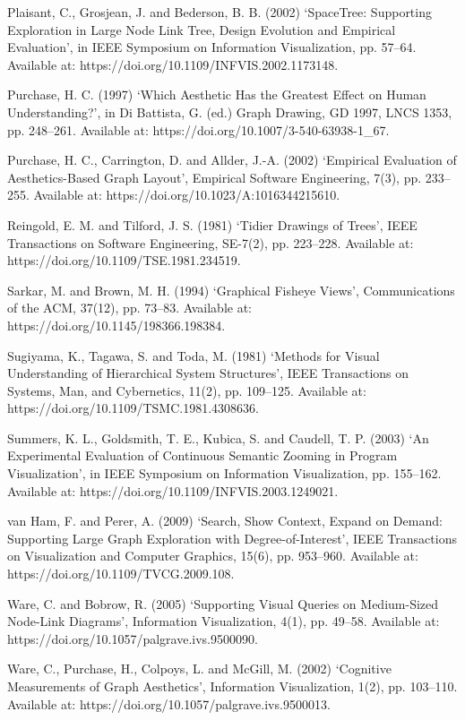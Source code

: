 \documentclass[11pt,a4paper,oneside,extrafontsizes]{memoir}
\begin{document}
Plaisant, C., Grosjean, J. and Bederson, B. B. (2002) ‘SpaceTree: Supporting Exploration in Large Node Link Tree, Design Evolution and Empirical Evaluation’, in IEEE Symposium on Information Visualization, pp. 57–64. Available at: https://doi.org/10.1109/INFVIS.2002.1173148.

Purchase, H. C. (1997) ‘Which Aesthetic Has the Greatest Effect on Human Understanding?’, in Di Battista, G. (ed.) Graph Drawing, GD 1997, LNCS 1353, pp. 248–261. Available at: https://doi.org/10.1007/3-540-63938-1\_67.

Purchase, H. C., Carrington, D. and Allder, J.-A. (2002) ‘Empirical Evaluation of Aesthetics-Based Graph Layout’, Empirical Software Engineering, 7(3), pp. 233–255. Available at: https://doi.org/10.1023/A:1016344215610.

Reingold, E. M. and Tilford, J. S. (1981) ‘Tidier Drawings of Trees’, IEEE Transactions on Software Engineering, SE-7(2), pp. 223–228. Available at: https://doi.org/10.1109/TSE.1981.234519.

Sarkar, M. and Brown, M. H. (1994) ‘Graphical Fisheye Views’, Communications of the ACM, 37(12), pp. 73–83. Available at: https://doi.org/10.1145/198366.198384.

Sugiyama, K., Tagawa, S. and Toda, M. (1981) ‘Methods for Visual Understanding of Hierarchical System Structures’, IEEE Transactions on Systems, Man, and Cybernetics, 11(2), pp. 109–125. Available at: https://doi.org/10.1109/TSMC.1981.4308636.

Summers, K. L., Goldsmith, T. E., Kubica, S. and Caudell, T. P. (2003) ‘An Experimental Evaluation of Continuous Semantic Zooming in Program Visualization’, in IEEE Symposium on Information Visualization, pp. 155–162. Available at: https://doi.org/10.1109/INFVIS.2003.1249021.

van Ham, F. and Perer, A. (2009) ‘Search, Show Context, Expand on Demand: Supporting Large Graph Exploration with Degree-of-Interest’, IEEE Transactions on Visualization and Computer Graphics, 15(6), pp. 953–960. Available at: https://doi.org/10.1109/TVCG.2009.108.

Ware, C. and Bobrow, R. (2005) ‘Supporting Visual Queries on Medium-Sized Node-Link Diagrams’, Information Visualization, 4(1), pp. 49–58. Available at: https://doi.org/10.1057/palgrave.ivs.9500090.

Ware, C., Purchase, H., Colpoys, L. and McGill, M. (2002) ‘Cognitive Measurements of Graph Aesthetics’, Information Visualization, 1(2), pp. 103–110. Available at: https://doi.org/10.1057/palgrave.ivs.9500013.
\end{document}
